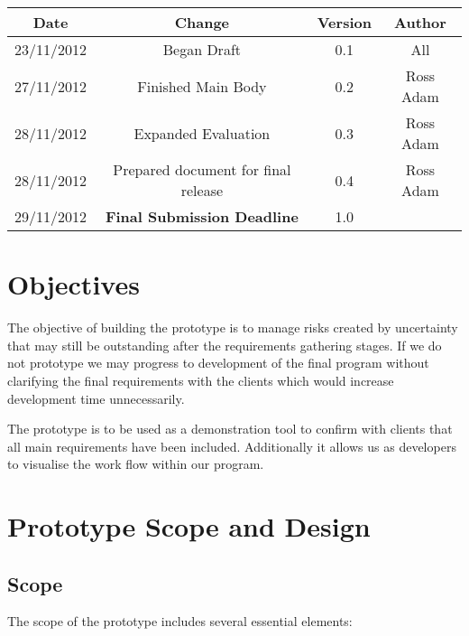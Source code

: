 \documentclass{l3deliverable}
\begin{document}
\begin{center}{
\begin{tabular}{|c|c|c|c|}
\hline \textbf{Date} &\textbf{ Change} & \textbf{Version} &\textbf{Author}\\ 
\hline  23/11/2012 & Began Draft & 0.1 & All\\
\hline 27/11/2012 & Finished Main Body & 0.2 & Ross Adam\\
\hline 28/11/2012 & Expanded Evaluation & 0.3 & Ross
Adam\\
\hline 28/11/2012 & Prepared document for final release & 0.4 & Ross
Adam\\
\hline 29/11/2012 & \textbf{Final Submission Deadline} & 1.0 &  \\ 
\hline 
\end{tabular} }
\end{center}


\section{Objectives}

The objective of building the prototype is to manage risks created by uncertainty that may still be outstanding after the requirements gathering stages. If we do not prototype we may progress to development of the final program without clarifying the final requirements with the clients which would increase development time unnecessarily.

The prototype is to be used as a demonstration tool to confirm with clients that all main requirements have been included. Additionally it allows us as developers to visualise the work flow within our program. 


\section{Prototype Scope and Design}

\subsection{Scope}

The scope of the prototype includes several essential elements:\\
\end{document}
